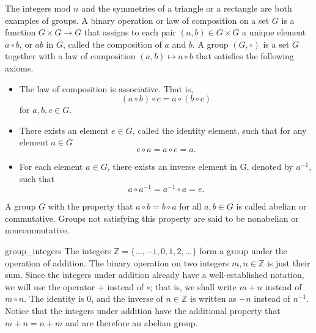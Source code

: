  
The integers mod $n$ and the symmetries of a triangle or a rectangle are both examples of groups.  A {\bfi binary operation\/} or {\bfi law of composition\/} on a set $G$ is a function $G \times G \rightarrow G$ that assigns to each pair $(a,b) \in G \times G$ a unique element $a \circ b$, or $ab$ in $G$, called the composition of $a$ and $b$.  A {\bfi group} $(G, \circ )$ is a set $G$ together with a law of composition $(a,b) \mapsto a \circ b$ that satisfies the following axioms. 
\begin{itemize}
 
\item
The law of composition is {\bfi associative}. That is,
\[
(a \circ b) \circ c = a \circ (b \circ c)
\]
for $a, b, c \in G$.
 
\item
There exists an element $e \in G$, called the {\bfi identity element}, such that for any element $a \in G$ 
\[
e \circ a = a \circ e = a.
\]
 
\item
For each element $a \in G$, there exists an {\bfi inverse element\/} in G, denoted by $a^{-1}$, such that 
\[
a \circ a^{-1} = a^{-1} \circ a = e.
\]
\end{itemize}
A group $G$ with the property that $a \circ b = b \circ a$ for all $a, b \in G$ is called {\bfi abelian\/} or {\bfi commutative}.  Groups not satisfying this property are said to be  {\bfi nonabelian\/} or {\bfi noncommutative}.  

\begin{example}{group_integers}
The integers ${\mathbb Z } = \{ \ldots , -1, 0, 1, 2, \ldots \}$ form a group under the operation of addition.  The binary operation on two integers $m, n \in {\mathbb Z}$ is just their sum.  Since the integers under addition already have a well-established notation, we will use the operator $+$ instead of $\circ$; that is, we shall write $m + n$ instead of $m \circ n$.  The identity is 0, and the inverse of $n \in {\mathbb Z}$ is written as $-n$ instead of $n^{-1}$.  Notice that the integers under addition have the additional property that $m + n = n + m$ and are therefore an abelian group.   
\end{example}

